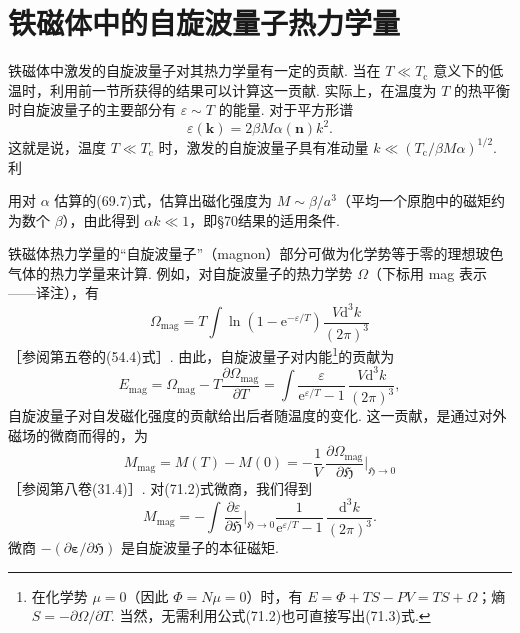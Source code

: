 \section{铁磁体中的自旋波量子\quad 热力学量}

铁磁体中激发的自旋波量子对其热力学量有一定的贡献. 当在 $T\ll T_{\mathrm{c}}$ 意义下的低温时，利用前一节所获得的结果可以计算这一贡献. 实际上，在温度为 $T$ 的热平衡时自旋波量子的主要部分有 $\varepsilon\sim T$ 的能量. 对于平方形谱
\begin{equation}
\varepsilon(\bm{k})=2\beta M\alpha(\bm{n})k^2.
\end{equation}
这就是说，温度 $T\ll T_{\mathrm{c}}$ 时，激发的自旋波量子具有准动量 $k\ll(T_{\mathrm{c}}/\beta M\alpha)^{1/2}$. 利

用对 $\alpha$ 估算的(69.7)式，估算出磁化强度为 $M\sim\beta/a^3$（平均一个原胞中的磁矩约为数个 $\beta$），由此得到 $\alpha k\ll1$，即§70结果的适用条件.

铁磁体热力学量的“自旋波量子”（magnon）部分可做为化学势等于零的理想玻色气体的热力学量来计算. 例如，对自旋波量子的热力学势 $\varOmega$（下标用 mag 表示——译注），有
\begin{equation}
\varOmega_{\mathrm{mag}}=T\int\ln(1-\mathrm{e}^{-\varepsilon/T})
\frac{V\mathrm{d}^3k}{(2\pi)^3}
\end{equation}
［参阅第五卷的(54.4)式］. 由此，自旋波量子对内能\footnote{在化学势 $\mu=0$（因此 $\varPhi=N\mu=0$）时，有 $E=\varPhi+TS-PV=TS+\varOmega$；熵 $S=-\partial\varOmega/\partial T$. 当然，无需利用公式(71.2)也可直接写出(71.3)式.}的贡献为
\begin{equation}
E_{\mathrm{mag}}=\varOmega_{\mathrm{mag}}-T\frac{\partial\varOmega_{\mathrm{mag}}}{\partial T}
=\int\frac{\varepsilon}{\mathrm{e}^{\varepsilon/T}-1}\,\frac{V\mathrm{d}^3k}{(2\pi)^3},
\end{equation}
自旋波量子对自发磁化强度的贡献给出后者随温度的变化. 这一贡献，是通过对外磁场的微商而得的，为
\begin{equation*}
M_{\mathrm{mag}}=M(T)-M(0)=-\frac{1}{V}\,\frac{\partial\varOmega_{\mathrm{mag}}}{\partial\mathfrak{H}}
\bigg|_{\mathfrak{H}\to0}
\end{equation*}
［参阅第八卷(31.4)］. 对(71.2)式微商，我们得到
\begin{equation}
M_{\mathrm{mag}}=-\int\frac{\partial\varepsilon}{\partial\mathfrak{H}}
\bigg|_{\mathfrak{H}\to0}\frac{1}{\mathrm{e}^{\varepsilon/T}-1}\,\frac{\mathrm{d}^3k}{(2\pi)^3}.
\end{equation}
微商 $-(\partial\bm{\varepsilon}/\partial\mathfrak{H})$ 是自旋波量子的本征磁矩.

